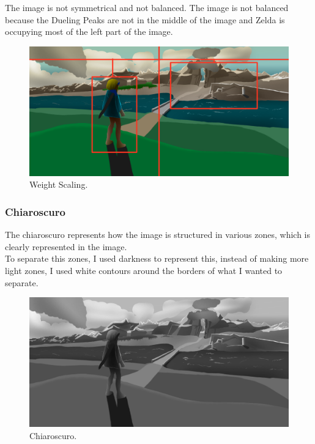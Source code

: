 \documentclass{cup-pan}
\begin{document}
            The image is not symmetrical and not balanced. The image is not balanced because the Dueling Peaks are not in the middle of the image and Zelda is occupying most of the left part of the image.\\
            \begin{figure}[H]
                \includegraphics[width=\textwidth]{Imagenes/Fanart1/Analysis/balanza.png}
                \caption{Weight Scaling.}
            \end{figure}

        \subsubsection{Chiaroscuro}

            The chiaroscuro represents how the image is structured in various zones, which is clearly represented in the image.\\
            To separate this zones, I used darkness to represent this, instead of making more light zones, I used white contours around the borders of what I wanted to separate.\\
            \begin{figure}[H]
                \includegraphics[width=\textwidth]{Imagenes/Fanart1/Analysis/claroscuro.png}
                \caption{Chiaroscuro.}
            \end{figure}
\end{document}
